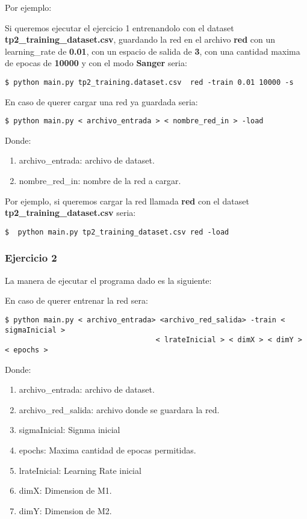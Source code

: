 Por ejemplo: 

Si queremos ejecutar el ejercicio 1 entrenandolo con el dataset \textbf{tp2\_training\_dataset.csv}, guardando la red en el archivo 
\textbf{red} con un learning\_rate de \textbf{0.01}, con un espacio de salida de \textbf{3}, con una cantidad maxima de epocas de \textbf{10000} y con el modo \textbf{Sanger} seria:

\begin{verbatim}
$ python main.py tp2_training.dataset.csv  red -train 0.01 10000 -s
\end{verbatim}

En caso de querer cargar una red ya guardada seria:

\begin{verbatim}
$ python main.py < archivo_entrada > < nombre_red_in > -load
\end{verbatim}

Donde:

\begin{enumerate}
\item archivo\_entrada: archivo de dataset.
\item nombre\_red\_in: nombre de la red a cargar.
\end{enumerate}

Por ejemplo, si queremos cargar la red llamada \textbf{red} con el dataset \textbf{tp2\_training\_dataset.csv} seria:

\begin{verbatim}
$  python main.py tp2_training_dataset.csv red -load
\end{verbatim}

\subsubsection{Ejercicio 2}

La manera de ejecutar el programa dado es la siguiente:

En caso de querer entrenar la red sera:

\begin{verbatim}
$ python main.py < archivo_entrada> <archivo_red_salida> -train < sigmaInicial > 
                                   < lrateInicial > < dimX > < dimY > < epochs >
\end{verbatim}

Donde:

\begin{enumerate}
\item archivo\_entrada: archivo de dataset.
\item archivo\_red\_salida: archivo donde se guardara la red.
\item sigmaInicial: Signma inicial
\item epochs: Maxima cantidad de epocas permitidas.
\item lrateInicial: Learning Rate inicial
\item dimX: Dimension de M1.
\item dimY: Dimension de M2.
\end{enumerate}

